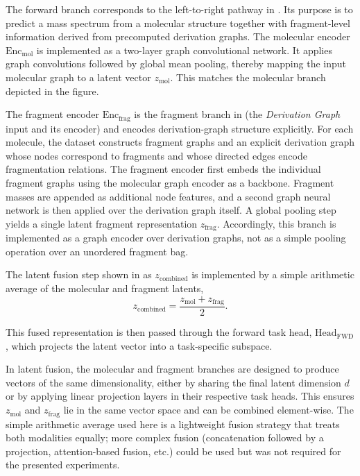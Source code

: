 The forward branch corresponds to the left-to-right pathway in . 
Its purpose is to predict a mass spectrum from a molecular structure together with fragment-level information derived from precomputed derivation graphs. 
The molecular encoder $\mathrm{Enc}_{\mathrm{mol}}$ is implemented as a two-layer graph convolutional network.
It applies graph convolutions followed by global mean pooling, thereby mapping the input molecular graph to a latent vector $z_{\mathrm{mol}}$. 
This matches the molecular branch depicted in the figure.

The fragment encoder $\mathrm{Enc}_{\mathrm{frag}}$ is the fragment branch in  (the \emph{Derivation Graph} input and its encoder) and encodes derivation-graph structure explicitly.
For each molecule, the dataset constructs fragment graphs and an explicit derivation graph whose nodes correspond to fragments and whose directed edges encode fragmentation relations. 
The fragment encoder first embeds the individual fragment graphs using the molecular graph encoder as a backbone. 
Fragment masses are appended as additional node features, and a second graph neural network is then applied over the derivation graph itself. 
A global pooling step yields a single latent fragment representation $z_{\mathrm{frag}}$. 
Accordingly, this branch is implemented as a graph encoder over derivation graphs, not as a simple pooling operation over an unordered fragment bag.

The latent fusion step shown in  as $z_{\mathrm{combined}}$ is implemented by a simple arithmetic average of the molecular and fragment latents,
\begin{equation}
    \label{eq:arithmetic_fusion}
    z_{\mathrm{combined}} = \frac{z_{\mathrm{mol}} + z_{\mathrm{frag}}}{2}.
\end{equation}

This fused representation is then passed through the forward task head, \texttt{$\text{Head}_{\mathrm{FWD}}$}, which projects the latent vector into a task-specific subspace. 

In latent fusion, the molecular and fragment branches are designed to produce vectors of the same dimensionality, either by sharing the final latent dimension $d$ or by applying linear projection layers in their respective task heads.
This ensures $z_{\mathrm{mol}}$ and $z_{\mathrm{frag}}$ lie in the same vector space and can be combined element-wise. 
The simple arithmetic average used here  is a lightweight fusion strategy that treats both modalities equally; more complex fusion (concatenation followed by a projection, attention-based fusion, etc.) could be used but was not required for the presented experiments.

